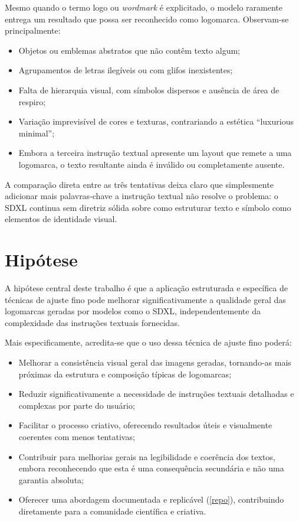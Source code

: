 \documentclass[12pt, %
openright, 
oneside, %
a4paper,    %
brazil]{facom-ufu-abntex2}
\begin{document}
Mesmo quando o termo logo ou \emph{wordmark} é explicitado, o modelo raramente entrega um resultado que possa ser reconhecido como logomarca. Observam-se principalmente:

\begin{itemize}
    \item Objetos ou emblemas abstratos que não contêm texto algum;
    \item Agrupamentos de letras ilegíveis ou com glifos inexistentes;
    \item Falta de hierarquia visual, com símbolos dispersos e ausência de área de respiro;
    \item Variação imprevisível de cores e texturas, contrariando a estética ``luxurious minimal'';
    \item Embora a terceira instrução textual apresente um layout que remete a uma logomarca, o texto resultante ainda é inválido ou completamente ausente.
\end{itemize}

A comparação direta entre as três tentativas deixa claro que simplesmente adicionar mais palavras-chave a instrução textual não resolve o problema: o SDXL continua sem diretriz sólida sobre como estruturar texto e símbolo como elementos de identidade visual.

\section{Hipótese}

A hipótese central deste trabalho é que a aplicação estruturada e específica de técnicas de ajuste fino pode melhorar significativamente a qualidade geral das logomarcas geradas por modelos como o SDXL, independentemente da complexidade das instruções textuais fornecidas.

Mais especificamente, acredita-se que o uso dessa técnica de ajuste fino poderá:

\begin{itemize}
    \item Melhorar a consistência visual geral das imagens geradas, tornando-as mais próximas da estrutura e composição típicas de logomarcas;
    \item Reduzir significativamente a necessidade de instruções textuais detalhadas e complexas por parte do usuário;
    \item Facilitar o processo criativo, oferecendo resultados úteis e visualmente coerentes com menos tentativas;
    \item Contribuir para melhorias gerais na legibilidade e coerência dos textos, embora reconhecendo que esta é uma consequência secundária e não uma garantia absoluta;
    \item Oferecer uma abordagem documentada e replicável (\ref{repo}), contribuindo diretamente para a comunidade científica e criativa.
\end{itemize}
\end{document}
